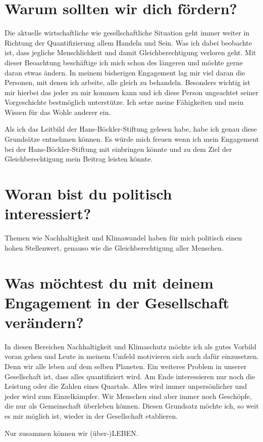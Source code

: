 \documentclass[12pt]{scrreprt}
\begin{document}
\section*{Warum sollten wir dich fördern?}
    Die aktuelle wirtschaftliche wie gesellschaftliche Situation geht immer weiter in Richtung der Quantifizierung allem Handeln und Sein.
    Was ich dabei beobachte ist, dass jegliche Menschlichkeit und damit Gleichberechtigung verloren geht.
    Mit dieser Beoachtung beschäftige ich mich schon des längeren und möchte gerne daran etwas ändern.
    In meinem bisherigen Engagement lag mir viel daran die Personen, mit denen ich arbeite, alle gleich zu behandeln. Besonders wichtig ist mir 
    hierbei das jeder zu mir kommen kann und ich diese Person ungeachtet seiner Vorgeschichte bestmöglich unterstütze. 
    Ich setze meine Fähigkeiten und mein Wissen für das Wohle anderer ein.

    Als ich das Leitbild der Hans-Böckler-Stiftung gelesen habe, habe ich genau diese Grundsätze entnehmen können.
    Es würde mich freuen wenn ich mein Engagement bei der Hans-Böckler-Stiftung mit einbringen könnte und zu dem Ziel der Gleichberechtigung mein Beitrag leisten könnte.
\color{black}
\section*{Woran bist du politisch interessiert?}
    Themen wie Nachhaltigkeit und Klimawandel haben für mich politisch einen
    hohen Stellenwert, genauso wie die Gleichberechtigung aller Menschen.

\section*{Was möchtest du mit deinem Engagement in der Gesellschaft verändern?}

    In diesen Bereichen Nachhaltigkeit und Klimaschutz möchte ich als gutes Vorbild voran gehen und
    Leute in meinem Umfeld motivieren sich auch dafür einzusetzen. Denn wir alle leben auf dem selben Planeten.
    Ein weiteres Problem in unserer Gesellschaft ist,  dass alles quantifiziert wird.
    Am Ende interessieren nur noch die Leistung oder die Zahlen eines Quartals. 
    Alles wird immer unpersönlicher und jeder wird zum Einzelkämpfer. Wir Menschen sind aber immer noch Geschöpfe, die 
    nur als Gemeinschaft überleben können. Diesen Grundsatz möchte ich, so weit es mir möglich ist, wieder in der Gesellschaft etablieren. 

    Nur zusammen können wir (über-)LEBEN.
\end{document}
